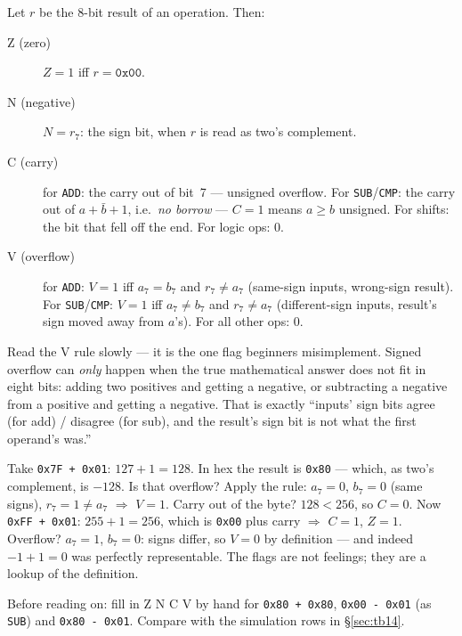 \begin{definition}
Let $r$ be the 8-bit result of an operation. Then:
\begin{description}
\item[Z (zero)] $Z=1$ iff $r=\texttt{0x00}$.
\item[N (negative)] $N=r_7$: the sign bit, when $r$ is read as two's
complement.
\item[C (carry)] for \texttt{ADD}: the carry out of bit~7 --- unsigned
overflow. For \texttt{SUB}/\texttt{CMP}: the carry out of
$a+\bar b+1$, i.e.\ \emph{no borrow} --- $C=1$ means $a\geq b$
unsigned. For shifts: the bit that fell off the end. For logic ops: 0.
\item[V (overflow)] for \texttt{ADD}: $V=1$ iff $a_7=b_7$ and
$r_7\neq a_7$ (same-sign inputs, wrong-sign result). For
\texttt{SUB}/\texttt{CMP}: $V=1$ iff $a_7\neq b_7$ and $r_7\neq a_7$
(different-sign inputs, result's sign moved away from $a$'s). For all
other ops: 0.
\end{description}
\end{definition}

Read the V rule slowly --- it is the one flag beginners misimplement.
Signed overflow can \emph{only} happen when the true mathematical
answer does not fit in eight bits: adding two positives and getting a
negative, or subtracting a negative from a positive and getting a
negative. That is exactly ``inputs' sign bits agree (for add) /
disagree (for sub), and the result's sign bit is not what the first
operand's was.''

\begin{example}
Take \texttt{0x7F + 0x01}: $127+1=128$. In hex the result is
\texttt{0x80} --- which, as two's complement, is $-128$. Is that
overflow? Apply the rule: $a_7=0$, $b_7=0$ (same signs), $r_7=1\neq
a_7$ $\Rightarrow$ $V=1$. Carry out of the byte? $128<256$, so $C=0$.
Now \texttt{0xFF + 0x01}: $255+1=256$, which is \texttt{0x00} plus
carry $\Rightarrow$ $C=1$, $Z=1$. Overflow? $a_7=1$, $b_7=0$: signs
differ, so $V=0$ by definition --- and indeed $-1+1=0$ was perfectly
representable. The flags are not feelings; they are a lookup of the
definition.
\end{example}

\begin{checkpoint}
Before reading on: fill in Z N C V by hand for \texttt{0x80 + 0x80},
\texttt{0x00 - 0x01} (as \texttt{SUB}) and \texttt{0x80 - 0x01}.
Compare with the simulation rows in \S\ref{sec:tb14}.
\end{checkpoint}


